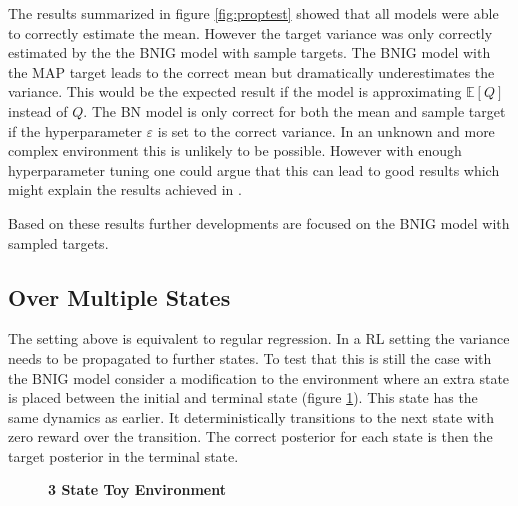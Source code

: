 The results summarized in figure \ref{fig:proptest} showed that all models were able to correctly estimate the mean. However the target variance was only correctly estimated by the the BNIG model with sample targets. The BNIG model with the MAP target leads to the correct mean but dramatically underestimates the variance. This would be the expected result if the model is approximating $\mathbb{E}[Q]$ instead of $Q$. The BN model is only correct for both the mean and sample target if the hyperparameter $\varepsilon$ is set to the correct variance. In an unknown and more complex environment this is unlikely to be possible. However with enough hyperparameter tuning one could argue that this can lead to good results which might explain the results achieved in \cite{azziz_2018}.

Based on these results further developments are focused on the BNIG model with sampled targets.

\subsection{Over Multiple States}

The setting above is equivalent to regular regression. In a RL setting the variance needs to be propagated to further states. To test that this is still the case with the BNIG model consider a modification to the environment where an extra state is placed between the initial and terminal state (figure \ref{fig:3state}). This state has the same dynamics as earlier. It deterministically transitions to the next state with zero reward over the transition. The correct posterior for each state is then the target posterior in the terminal state. 

\begin{figure}[H]
    \centering
    \caption{\textbf{3 State Toy Environment}}
    \label{fig:3state}
\end{figure}


